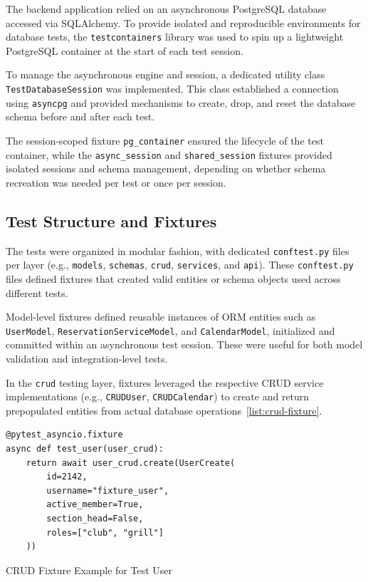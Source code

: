 The backend application relied on an asynchronous PostgreSQL database accessed via SQLAlchemy. To provide isolated and reproducible environments for database tests, the \texttt{testcontainers} library was used to spin up a lightweight PostgreSQL container at the start of each test session.

To manage the asynchronous engine and session, a dedicated utility class \texttt{TestDatabaseSession} was implemented. This class established a connection using \texttt{asyncpg} and provided mechanisms to create, drop, and reset the database schema before and after each test.

The session-scoped fixture \texttt{pg\_container} ensured the lifecycle of the test container, while the \texttt{async\_session} and \texttt{shared\_session} fixtures provided isolated sessions and schema management, depending on whether schema recreation was needed per test or once per session.

\subsection{Test Structure and Fixtures}

The tests were organized in modular fashion, with dedicated \texttt{conftest.py} files per layer (e.g., \texttt{models}, \texttt{schemas}, \texttt{crud}, \texttt{services}, and \texttt{api}). These \texttt{conftest.py} files defined fixtures that created valid entities or schema objects used across different tests.

Model-level fixtures defined reusable instances of ORM entities such as \texttt{UserModel}, \texttt{ReservationServiceModel}, and \texttt{CalendarModel}, initialized and committed within an asynchronous test session. These were useful for both model validation and integration-level tests.

In the \texttt{crud} testing layer, fixtures leveraged the respective CRUD service implementations (e.g., \texttt{CRUDUser}, \texttt{CRUDCalendar}) to create and return prepopulated entities from actual database operations~\ref{list:crud-fixture}.

\begin{listing}
  \begin{verbatim}
@pytest_asyncio.fixture
async def test_user(user_crud):
    return await user_crud.create(UserCreate(
        id=2142,
        username="fixture_user",
        active_member=True,
        section_head=False,
        roles=["club", "grill"]
    ))
\end{verbatim}
\caption{CRUD Fixture Example for Test User}
\label{list:crud-fixture}
\end{listing}


